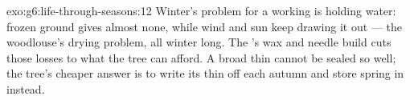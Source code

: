 \begin{solution}{exo:g6:life-through-seasons:12}
Winter's problem for a working  is holding water: frozen
ground gives  almost none, while wind and sun keep
drawing it out --- the woodlouse's drying problem, all
winter long. The  's wax and needle build cuts
those losses to what the tree can afford. A broad thin 
cannot be sealed so well; the  tree's cheaper
answer is to write its thin  off each autumn and
store spring in  instead.
\end{solution}

